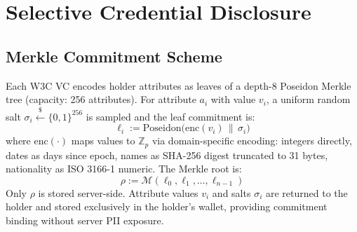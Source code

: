 \documentclass[journal,twoside,10pt]{IEEEtran}
\begin{document}
\section{Selective Credential Disclosure}
\label{sec:disclosure}

\subsection{Merkle Commitment Scheme}
Each W3C VC encodes holder attributes as leaves of a depth-8 Poseidon Merkle
tree (capacity: 256 attributes). For attribute $a_i$ with value $v_i$, a
uniform random salt $\sigma_i \xleftarrow{\$} \{0,1\}^{256}$ is sampled and
the leaf commitment is:
\begin{equation}
  \ell_i := \mathrm{Poseidon}\bigl(\mathrm{enc}(v_i) \,\|\, \sigma_i\bigr)
  \label{eq:leaf}
\end{equation}
\noindent where $\mathrm{enc}(\cdot)$ maps values to $\mathbb{Z}_p$ via
domain-specific encoding: integers directly, dates as days since epoch,
names as SHA-256 digest truncated to 31 bytes, nationality as ISO 3166-1
numeric. The Merkle root is:
\begin{equation}
  \rho := \mathcal{M}(\ell_0, \ell_1, \ldots, \ell_{n-1})
  \label{eq:root}
\end{equation}
Only $\rho$ is stored server-side. Attribute values $v_i$ and salts
$\sigma_i$ are returned to the holder and stored exclusively in the holder's
wallet, providing commitment binding without server PII exposure.
\end{document}
